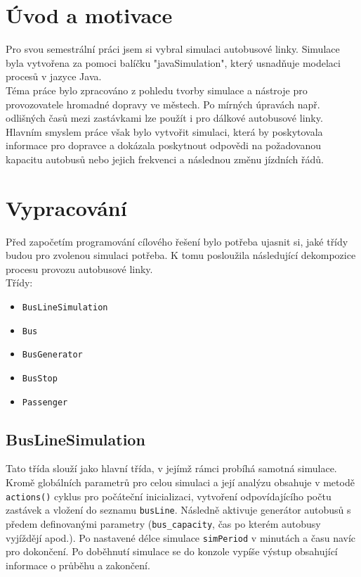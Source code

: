 \documentclass{article}
\begin{document}
	
	
	
	\section{Úvod a motivace}
		Pro svou semestrální práci jsem si vybral simulaci autobusové linky. Simulace byla vytvořena za pomoci balíčku "javaSimulation", který usnadňuje modelaci procesů v jazyce Java.\\
		
		Téma práce bylo zpracováno z pohledu tvorby simulace a nástroje pro provozovatele hromadné dopravy ve městech. Po mírných úpravách např. odlišných časů mezi zastávkami lze použít i pro dálkové autobusové linky. Hlavním smyslem práce však bylo vytvořit simulaci, která by poskytovala informace pro dopravce a dokázala poskytnout odpovědi na požadovanou kapacitu autobusů nebo jejich frekvenci a následnou změnu jízdních řádů.
	\section{Vypracování}
		Před započetím programování cílového řešení bylo potřeba ujasnit si, jaké třídy budou pro zvolenou simulaci potřeba. K tomu posloužila následující dekompozice procesu provozu autobusové linky.\\
		Třídy:
		\begin{itemize}
			\item \verb|BusLineSimulation|
			\item \verb|Bus|
			\item \verb|BusGenerator|
			\item \verb|BusStop|
			\item \verb|Passenger|
		\end{itemize}
		\subsection{BusLineSimulation}
			Tato třída slouží jako hlavní třída, v jejímž rámci probíhá samotná simulace. Kromě globálních parametrů pro celou simulaci a její analýzu obsahuje v metodě \verb|actions()| cyklus pro počáteční inicializaci, vytvoření odpovídajícího počtu zastávek a vložení do seznamu \verb|busLine|. Následně aktivuje generátor autobusů s předem definovanými parametry (\verb|bus_capacity|, čas po kterém autobusy vyjíždějí apod.). Po nastavené délce simulace \verb|simPeriod| v minutách a času navíc pro dokončení. Po doběhnutí simulace se do konzole vypíše výstup obsahující informace o průběhu a zakončení.
\end{document}
